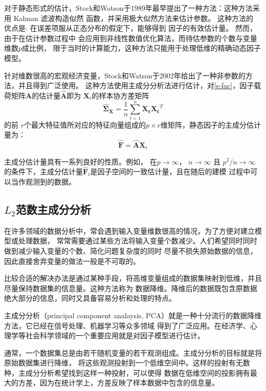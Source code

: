 对于静态形式的估计，Stock和Watson于1989年最早提出了一种方法\cite{stock1989new}：这种方法采用
Kalman 滤波构造似然 函数，并采用极大似然方法来估计参数。
这种方法的 优点是: 在误差项服从正态分布的假定下，能够得到 因子的有效估计量。
然而，由于在估计参数过程中 会应用到非线性数值优化算法，而待估参数的个数与变量维数$p$成比例，
限于当时的计算能力，这种方法只能用于处理低维的精确动态因子模型。

针对维数很高的宏观经济变量，Stock和Watson于2002年给出了一种非参数的方法\cite{stock2002forecasting}，并且得到广泛使用。
这种方法使用主成分分析法进行估计，对\eqref{s-fac}，因子载荷矩阵$\bm{A}$的估计量$\hat{\bm{A}}$即为
$\bm{X}_t$的样本协方差矩阵
\begin{equation}\label{fac-pro}
\hat{\bm{\Sigma}}_{\bm{X}} = \frac1{n}\sum_{t=1}^n\bm{X_t}\bm{X_t}^T
\end{equation}
的前
$r$个最大特征值所对应的特征向量组成的$p\times r$维矩阵，静态因子的主成分估计量为：
\begin{equation}\label{factor}
\hat{\bm{F}} = \hat{\bm{A}}\bm{X}_t 
\end{equation}

主成分估计量具有一系列良好的性质。例如， 在$p \rightarrow \infty$， $n \rightarrow \infty$ 且 $p^2 / n \rightarrow \infty$
的条件下，主成分估计量$\hat{\bm{F}}_t$是因子空间的一致估计量，且在随后的建模 过程中可以当作观测到的数据。

\subsection{$L_2$范数主成分分析}
在许多领域的数据分析中，常会遇到输入变量维数很高的情况，为了方便对建立模型或处理数据，
常常需要通过某些方法将输入变量个数减少。人们希望同时同时做到减少输入变量的个数、简化问题复杂度的同时
尽量不损失原始数据的信息，因此直接舍弃变量的做法一般是不可取的。

比较合适的解决办法是通过某种手段，将高维变量组成的数据集映射到低维，并且尽量保持数据集的信息量。这种方法称为
数据降维。降维后的数据既包含原数据绝大部分的信息，同时又具备容易分析和处理的特点。

主成分分析（principal component analaysis, PCA）就是一种十分流行的数据降维方法，它已经在信号处理、机器学习等众多领域
得到了广泛应用。在经济学、心理学等社会科学领域的一个重要应用就是对因子模型进行估计。

通常，一个数据集总是由若干随机变量的若干观测组成。主成分分析的目标就是将原始数据集进行降维，
将这些观测投射到一个低维空间中。这样的投射有无数种，主成分分析希望找到这样一种投射，可以使得
数据在低维空间的投影拥有最大的方差，因为在统计学上，方差反映了样本数据中包含的信息量。

